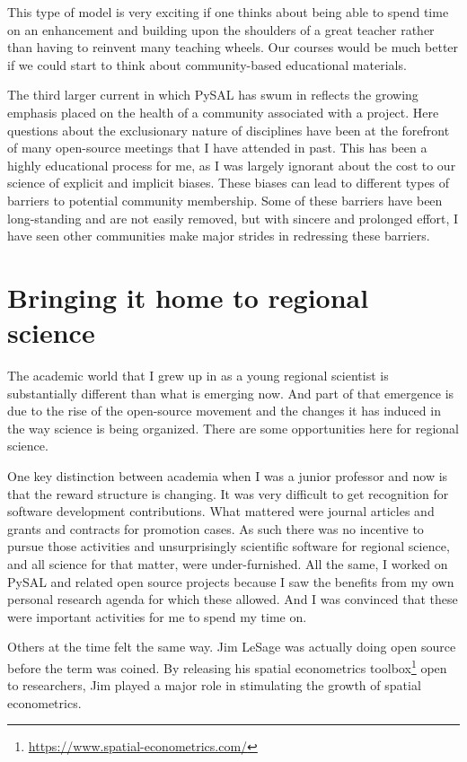 \documentclass[11pt]{article}
\begin{document}
This type of model is very exciting if one thinks about being able to spend
time on an enhancement  and building upon the shoulders of a great teacher
rather than having to reinvent many teaching wheels. Our courses would be much
better if we could start to think about community-based educational
materials.


The third larger current in which PySAL has swum in reflects the growing emphasis
placed on the health of a community associated with a project. Here questions
about the exclusionary nature of disciplines have been at the forefront of many
open-source meetings that I have attended in past. This has been a highly
educational process for me, as I was largely ignorant about the cost to our
science of explicit and implicit biases. These biases can lead to different
types of barriers to potential community membership. Some of these barriers
have been long-standing and are not easily removed, but with sincere and
prolonged effort, I have seen other communities make major strides in
redressing these barriers.
\section*{Bringing it home to regional science}
\label{sec:org3ef7220}
The academic world that I grew up in as a young regional scientist is
substantially different than what is emerging now. And part of that emergence
is due to the rise of the open-source movement and the changes it has induced in
the way science is being organized. There are some opportunities here for
regional science.

One key distinction between academia when I was a junior professor and now is
that the reward structure is changing. It was very difficult to get recognition
for software development contributions. What mattered were journal articles and
grants and contracts for promotion cases. As such there was no incentive to
pursue those activities and unsurprisingly scientific software for regional
science, and all science for that matter, were under-furnished. All the same, I
worked on PySAL and related open source projects because I saw the benefits
from my own personal research agenda for which these allowed. And I was
convinced that these were important activities for me to spend my time on.

Others at the time felt the same way. Jim LeSage was actually doing open
source before the term was coined. By releasing his spatial econometrics
toolbox\footnote{\url{https://www.spatial-econometrics.com/}} open to researchers, Jim played a major role in stimulating the growth
of spatial econometrics.
\end{document}
